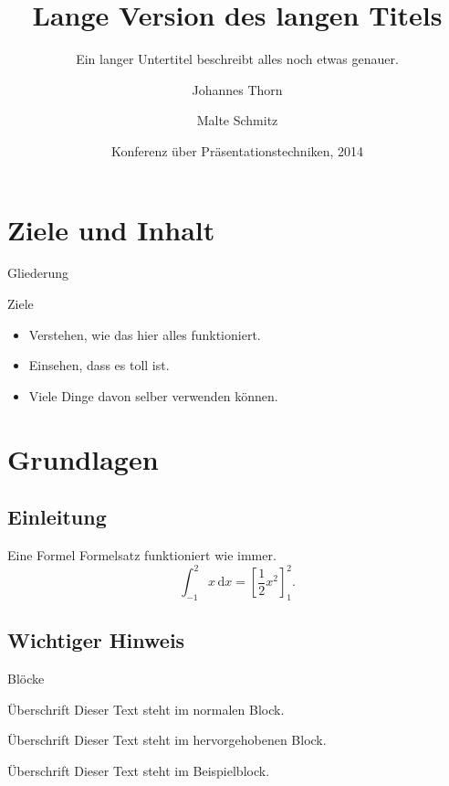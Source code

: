 \documentclass{beamer}
\title[Kurztitel]{%
  Lange Version des langen Titels}
\subtitle{Ein langer Untertitel beschreibt
  alles noch etwas genauer.}
\author[Thorn, Schmitz]{%
  Johannes Thorn \and Malte Schmitz}
\date[KPT 2014]{Konferenz über
  Präsentationstechniken, 2014}
\begin{document}
\begin{frame}
  \maketitle
\end{frame}

\section*{Ziele und Inhalt}

\begin{frame}{Gliederung}
  \tableofcontents
\end{frame}

\begin{frame}{Ziele}
  \begin{itemize}
    \item Verstehen, wie das hier alles funktioniert.
    \item Einsehen, dass es toll ist.
    \item Viele Dinge davon selber verwenden können.
  \end{itemize}
\end{frame}

\section{Grundlagen}

\subsection{Einleitung}

\begin{frame}{Eine Formel}
  Formelsatz funktioniert wie immer.
  \[ \int_{-1}^{2} x\,\mathrm{d}x = \left[
  \frac{1}{2}x^{2} \right]_{1}^{2}. \]
\end{frame}

\subsection{Wichtiger Hinweis}

\begin{frame}{Blöcke}
  \begin{block}{Überschrift}
    Dieser Text steht im normalen Block.
  \end{block}

  \begin{alertblock}{Überschrift}
    Dieser Text steht im hervorgehobenen Block.
  \end{alertblock}

  \begin{exampleblock}{Überschrift}
    Dieser Text steht im Beispielblock.
  \end{exampleblock}
\end{frame}
\end{document}
